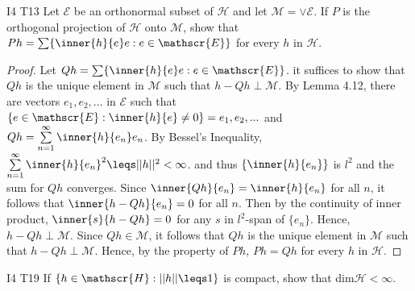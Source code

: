 \begin{exercise}{I4 T13}{}
    Let $\mathscr{E}$ be an orthonormal subset of $\mathscr{H}$ and let $\mathscr{M}=\vee \mathscr{E}$. 
    If $P$ is the orthogonal projection of $\mathscr{H}$ onto $\mathscr{M}$,
    show that $Ph=\sum\{\inner{h}{e}e:e\in\mathscr{E}\}$ for every $h$ in $\mathscr{H}$.
\end{exercise}
\begin{proof}
    Let $Qh=\sum\{\inner{h}{e}e:e\in\mathscr{E}\}$.
    it suffices to show that $Qh$ is the unique element in $\mathscr{M}$ such that $h-Qh\perp \mathscr{M}$.
    By Lemma 4.12, there are vectors $e_1,e_2,...$ in $\mathscr{E}$ such that $\{e\in\mathscr{E}:\inner{h}{e}\neq 0\}={e_1,e_2,...}$
    and $Qh=\sum\limits_{n=1}^{\infty}\inner{h}{e_n}e_n$.
    By Bessel's Inequality, $\sum\limits_{n=1}^{\infty}\inner{h}{e_n}^2\leqs ||h||^2<\infty$.
    and thus $\{\inner{h}{e_n}\}$ is $l^2$ and the sum for $Qh$ converges. Since $\inner{Qh}{e_n}=\inner{h}{e_n}$ for all $n$, 
    it follows that $\inner{h-Qh}{e_n}=0$ for all $n$. Then by the continuity of inner product, 
    $\inner{s}{h-Qh}= 0$ for any $s$ in $l^2$-span of $\{e_n\}$. Hence, $h-Qh\perp \mathscr{M}$.
    Since $Qh\in \mathscr{M}$, it follows that $Qh$ is the unique element in $\mathscr{M}$
    such that $h-Qh\perp \mathscr{M}$. Hence, by the property of $Ph$, $Ph=Qh$ for every $h$ in $\mathscr{H}$.
\end{proof}


\begin{exercise}{I4 T19}{}
    If $\{h\in \mathscr{H}: ||h||\leqs 1\}$ is compact, show that dim$\mathscr{H}<\infty$.
\end{exercise}

